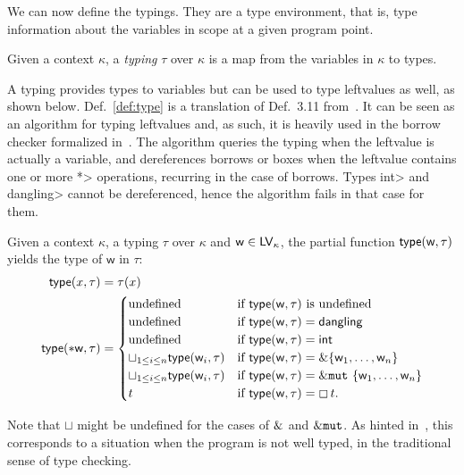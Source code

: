 We can now define the typings. They are a type environment, that is,
type information about the variables in scope at a given program point.

\begin{definition}[Typing]\label{def:typing}
  Given a context $\kappa$, a \emph{typing} $\tau$ over $\kappa$ is
  a map from the variables in $\kappa$ to types.
\end{definition}

A typing provides types to variables but can be used to type
leftvalues as well, as shown below. Def.~\ref{def:type} is a translation of
Def.~3.11 from~\cite{Pearce21}. It can be seen as an algorithm for typing leftvalues
and, as such, it is heavily used in the borrow checker formalized in~\cite{Pearce21}.
The algorithm queries the typing when the leftvalue is actually a variable,
and dereferences borrows or boxes when the leftvalue contains one or more
\<*> operations, recurring in the case of borrows.
Types \<int> and \<dangling> cannot be dereferenced, hence the
algorithm fails in that case for them.

\begin{definition}\label{def:type}
  Given a context $\kappa$, a typing $\tau$ over $\kappa$
  and $\mathsf{w}\in\mathsf{LV}_\kappa$, the partial function
  $\mathsf{type}(\mathsf{w},\tau)$ yields the type of $\mathsf{w}$ in $\tau$:
  \begin{align*}
    \mathsf{type}(x,\tau)&=\tau(x)\\
    \mathsf{type}(*\mathsf{w},\tau)&=\begin{cases}
    \text{undefined} & \text{if $\mathsf{type}(\mathsf{w},\tau)$ is undefined}\\
    \text{undefined} & \text{if $\mathsf{type}(\mathsf{w},\tau)=\mathsf{dangling}$}\\
    \text{undefined} & \text{if $\mathsf{type}(\mathsf{w},\tau)=\mathsf{int}$}\\
    \sqcup_{1\le i\le n}\mathsf{type}(\mathsf{w}_i,\tau) & \text{if $\mathsf{type}(\mathsf{w},\tau)=\&\{\mathsf{w}_1,\ldots,\mathsf{w}_n\}$}\\
    \sqcup_{1\le i\le n}\mathsf{type}(\mathsf{w}_i,\tau) & \text{if $\mathsf{type}(\mathsf{w},\tau)=\&\mathtt{mut}\ \{\mathsf{w}_1,\ldots,\mathsf{w}_n\}$}\\
    t & \text{if $\mathsf{type}(\mathsf{w},\tau)=\boxempty\,{t}$.}
    \end{cases}
  \end{align*}
\end{definition}

\noindent
Note that $\sqcup$ might be undefined for the cases of $\&$
and $\&\mathtt{mut}$.
As hinted in~\cite{Pearce21}, this corresponds to a situation when the program
is not well typed, in the traditional sense of type checking.

